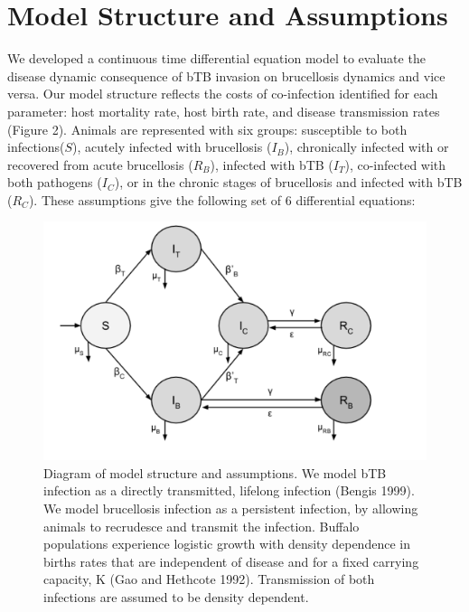 \documentclass[letterpaper,12pt]{article}
\begin{document}
\section*{Model Structure and Assumptions}
\indent
	We developed a continuous time differential equation model to evaluate the disease dynamic consequence of bTB invasion on brucellosis dynamics and vice versa.  
Our model structure reflects the costs of co-infection identified for each parameter: host mortality rate, host birth rate, and disease transmission rates (Figure 2).
Animals are represented with six groups: susceptible to both infections($S$), acutely infected with brucellosis ($I_{B}$), chronically infected with or recovered from acute brucellosis ($R_{B}$), infected with bTB ($I_{T}$), co-infected with both pathogens ($I_{C}$), or in the chronic stages of brucellosis and infected with bTB ($R_{C}$).  These assumptions give the following set of 6 differential equations: 
\begin{figure}
\begin{center}
\includegraphics[width=5in]{bTB_Bruc_model}
\end{center}
\caption{Diagram of model structure and assumptions.  
We model bTB infection as a directly transmitted, lifelong infection (Bengis 1999).  
We model brucellosis infection as a persistent infection, by allowing animals to recrudesce and transmit the infection.
Buffalo populations experience logistic growth with density dependence in births rates that are independent of disease and for a fixed carrying capacity, K (Gao and Hethcote 1992).
Transmission of both infections are assumed to be density dependent.}
\label{fig2}
\end{figure}
\end{document}
